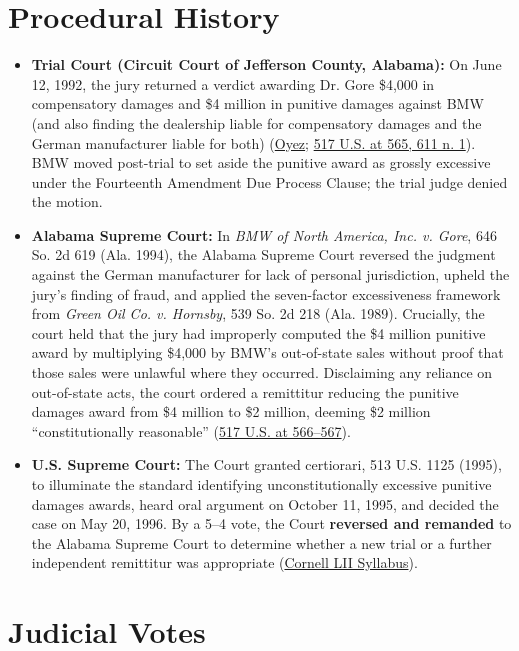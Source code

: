 \documentclass[12pt]{article}
\begin{document}
\section{Procedural History}

\begin{itemize}
\item \textbf{Trial Court (Circuit Court of Jefferson County, Alabama):} On June 12, 1992, the jury returned a verdict awarding Dr. Gore \$4,000 in compensatory damages and \$4 million in punitive damages against BMW (and also finding the dealership liable for compensatory damages and the German manufacturer liable for both) (\href{https://www.oyez.org/cases/1995/94-896}{Oyez}; \href{https://supreme.justia.com/cases/federal/us/517/559/}{517 U.S. at 565, 611 n. 1}). BMW moved post-trial to set aside the punitive award as grossly excessive under the Fourteenth Amendment Due Process Clause; the trial judge denied the motion.
\item \textbf{Alabama Supreme Court:} In \textit{BMW of North America, Inc. v. Gore}, 646 So. 2d 619 (Ala. 1994), the Alabama Supreme Court reversed the judgment against the German manufacturer for lack of personal jurisdiction, upheld the jury's finding of fraud, and applied the seven-factor excessiveness framework from \textit{Green Oil Co. v. Hornsby}, 539 So. 2d 218 (Ala. 1989). Crucially, the court held that the jury had improperly computed the \$4 million punitive award by multiplying \$4,000 by BMW's out-of-state sales without proof that those sales were unlawful where they occurred. Disclaiming any reliance on out-of-state acts, the court ordered a remittitur reducing the punitive damages award from \$4 million to \$2 million, deeming \$2 million ``constitutionally reasonable'' (\href{https://supreme.justia.com/cases/federal/us/517/559/}{517 U.S. at 566--567}).
\item \textbf{U.S. Supreme Court:} The Court granted certiorari, 513 U.S. 1125 (1995), to illuminate the standard identifying unconstitutionally excessive punitive damages awards, heard oral argument on October 11, 1995, and decided the case on May 20, 1996. By a 5--4 vote, the Court \textbf{reversed and remanded} to the Alabama Supreme Court to determine whether a new trial or a further independent remittitur was appropriate (\href{https://www.law.cornell.edu/supct/html/94-896.ZS.html}{Cornell LII Syllabus}).
\end{itemize}

\section{Judicial Votes}
\end{document}
